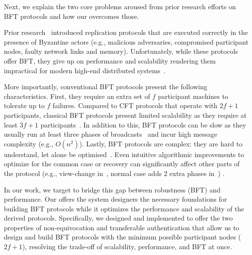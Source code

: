 Next, we explain the two core problems aroused from prior research efforts on BFT protocols and how our \projecttitle{} overcomes those.



 Prior research~\cite{Castro:2002, DBLP:journals/corr/abs-1803-05069, 10.1145/1658357.1658358} introduced replication protocols that are executed correctly in the presence of Byzantine actors (e.g., malicious adversaries, compromised participant nodes, faulty network links and memory). Unfortunately, while these protocols offer BFT, they give up on performance and scalability rendering them impractical for modern high-end distributed systems~\cite{bftForSkeptics}. 

More importantly, conventional BFT protocols present the following characteristics. First, they require an extra set of $f$ participant machines to tolerate up to $f$ failures. Compared to CFT protocols that operate with $2f+1$ participants, classical BFT protocols present limited scalability as they require at least $3f+1$ participants~\cite{BFT_THEORY}. In addition to this, BFT protocols can be slow as they usually run at least three phases of broadcasts~\cite{Castro:2002, DBLP:journals/corr/abs-1803-05069} and incur high message complexity (e.g., $O(n^2)$). Lastly, BFT protocols are complex: they are hard to understand, let alone be optimised~\cite{10.1145/2658994}. Even intuitive algorithmic improvements to optimize for the common case or recovery can significantly affect other parts of the protocol (e.g., view-change in~\cite{10.1145/1658357.1658358}, normal case adds 2 extra phases in~\cite{DBLP:journals/corr/abs-1803-05069}) .%

 In our work, we target to bridge this gap between robustness (BFT) and performance. Our \projecttitle{} offers the system designers the necessary foundations for building BFT protocols while it optimizes the performance and scalability of the derived protocols. Specifically, we designed and implemented \projecttitle{} to offer the two properties of non-equivocation and transferable authentication that allow us to design and build BFT protocols with the minimum possible participant nodes ($2f+1$), resolving the trade-off of scalability, performance, and BFT at once. 

